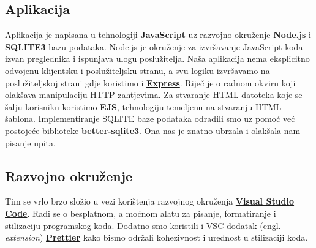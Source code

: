 		\subsection*{Aplikacija}
			Aplikacija je napisana u tehnologiji \textbf{\href{https://developer.mozilla.org/en-US/docs/Web/JavaScript}{JavaScript}} uz razvojno okruženje \textbf{\href{https://nodejs.org/en}{Node.js}} i \textbf{\href{https://www.npmjs.com/package/better-sqlite3}{SQLITE3}} bazu podataka. Node.js je okruženje za izvršavanje JavaScript koda izvan preglednika i ispunjava ulogu poslužitelja. Naša aplikacija nema eksplicitno odvojenu klijentsku i poslužiteljsku stranu, a svu logiku izvršavamo na poslužiteljskoj strani gdje koristimo i \textbf{\href{https://expressjs.com/}{Express}}. Riječ je o radnom okviru koji olakšava manipulaciju HTTP zahtjevima. Za stvaranje HTML datoteka koje se  šalju korisniku koristimo \textbf{\href{https://ejs.co/}{EJS}}, tehnologiju temeljenu na stvaranju HTML šablona. Implementiranje SQLITE baze podataka odradili smo uz pomoć već postojeće biblioteke \textbf{\href{https://www.npmjs.com/package/better-sqlite3}{better-sqlite3}}. Ona nas je znatno ubrzala i olakšala nam pisanje upita.

		\subsection*{Razvojno okruženje}
			Tim se vrlo brzo složio u vezi korištenja razvojnog okruženja \textbf{\href{https://code.visualstudio.com/}{Visual Studio Code}}. Radi se o besplatnom, a moćnom alatu za pisanje, formatiranje i stilizaciju programskog koda. Dodatno smo koristili i VSC dodatak (engl. \textit{extension}) \textbf{\href{https://prettier.io/}{Prettier}} kako bismo održali kohezivnost i urednost u stilizaciji koda.

